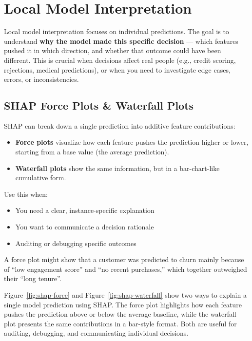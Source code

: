 \documentclass[12pt,openany]{book}
\begin{document}
\chapter{Local Model Interpretation}

Local model interpretation focuses on individual predictions. The goal is to understand \textbf{why the model made this specific decision} — which features pushed it in which direction, and whether that outcome could have been different. This is crucial when decisions affect real people (e.g., credit scoring, rejections, medical predictions), or when you need to investigate edge cases, errors, or inconsistencies.

\section{SHAP Force Plots \& Waterfall Plots}

SHAP can break down a single prediction into additive feature contributions:
\begin{itemize}
  \item \textbf{Force plots} visualize how each feature pushes the prediction higher or lower, starting from a base value (the average prediction).
  \item \textbf{Waterfall plots} show the same information, but in a bar-chart-like cumulative form.
\end{itemize}

Use this when:
\begin{itemize}
  \item You need a clear, instance-specific explanation
  \item You want to communicate a decision rationale
  \item Auditing or debugging specific outcomes
\end{itemize}

\begin{examplebox}
A force plot might show that a customer was predicted to churn mainly because of ``low engagement score'' and ``no recent purchases,'' which together outweighed their ``long tenure''.
\end{examplebox}

Figure~\ref{fig:shap-force} and Figure~\ref{fig:shap-waterfall} show two ways to explain a single model prediction using SHAP. The force plot highlights how each feature pushes the prediction above or below the average baseline, while the waterfall plot presents the same contributions in a bar-style format. Both are useful for auditing, debugging, and communicating individual decisions.
\end{document}
